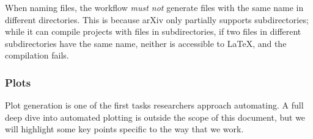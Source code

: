 \documentclass{article}
\newcommand\rfcword[1]{\emph{#1}\xspace}
\newcommand\mustnot{\rfcword{must not}}
\begin{document}
When naming files,
the workflow \mustnot generate files with the same name in different directories.
This is because arXiv only partially supports subdirectories;
while it can compile projects with files in subdirectories,
if two files in different subdirectories have the same name,
neither is accessible to LaTeX,
and the compilation fails.

\subsubsection{Plots}

Plot generation is one of the first tasks researchers approach automating.
A full deep dive into automated plotting is outside the scope of this document,
but we will highlight some key points specific to the way that we work.
\end{document}
